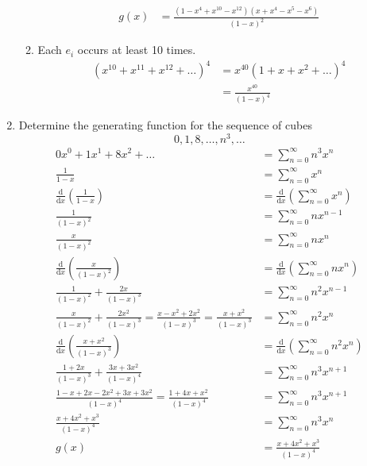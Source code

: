 \documentclass{article}
\begin{document}
\begin{enumerate}
\begin{enumerate}
\begin{align*}
  g(x)&=\frac{(1-x^4+x^{10}-x^{12})(x+x^4-x^5-x^6)}{(1-x)^2}
\end{align*}
\item
Each $e_i$ occurs at least 10 times.
\begin{align*}
  (x^{10}+x^{11}+x^{12}+\dots)^4&=x^{40}(1+x+x^2+\dots)^4\\
  &=\frac{x^{40}}{(1-x)^4}
\end{align*}
\end{enumerate}
\item
Determine the generating function for the sequence of cubes
\[0,1,8,\dots,n^3,\dots\]
\begin{align*}
  0x^0+1x^1+8x^2+\dots&=\sum\limits_{n=0}^{\infty}{n^3x^n}\\
  \frac{1}{1-x}&=\sum\limits_{n=0}^\infty{x^n}\\
  \frac{\mathrm{d}}{\mathrm{d}x}\left(\frac{1}{1-x}\right)&=\frac{\mathrm{d}}{\mathrm{d}x}\left(\sum\limits_{n=0}^\infty{x^n}\right)\\
  \frac{1}{(1-x)^2}&=\sum\limits_{n=0}^\infty{nx^{n-1}}\\
  \frac{x}{(1-x)^2}&=\sum\limits_{n=0}^\infty{nx^n}\\
  \frac{\mathrm{d}}{\mathrm{d}x}\left(\frac{x}{(1-x)^2}\right)&=\frac{\mathrm{d}}{\mathrm{d}x}\left(\sum\limits_{n=0}^\infty{nx^n}\right)\\
  \frac{1}{(1-x)^2}+\frac{2x}{(1-x)^3}&=\sum\limits_{n=0}^\infty{n^2x^{n-1}}\\
  \frac{x}{(1-x)^2}+\frac{2x^2}{(1-x)^3}=\frac{x-x^2+2x^2}{(1-x)^3}=\frac{x+x^2}{(1-x)^3}&=\sum\limits_{n=0}^\infty{n^2x^n}\\
  \frac{\mathrm{d}}{\mathrm{d}x}\left(\frac{x+x^2}{(1-x)^3}\right)&=\frac{\mathrm{d}}{\mathrm{d}x}\left(\sum\limits_{n=0}^\infty{n^2x^n}\right)\\
  \frac{1+2x}{(1-x)^3}+\frac{3x+3x^2}{(1-x)^4}&=\sum\limits_{n=0}^\infty{n^3x^{n+1}}\\
  \frac{1-x+2x-2x^2+3x+3x^2}{(1-x)^4}=\frac{1+4x+x^2}{(1-x)^4}&=\sum\limits_{n=0}^\infty{n^3x^{n+1}}\\
  \frac{x+4x^2+x^3}{(1-x)^4}&=\sum\limits_{n=0}^\infty{n^3x^n}\\
  g(x)&=\frac{x+4x^2+x^3}{(1-x)^4}\\

\end{align*}
\end{enumerate}
\end{document}
